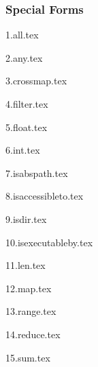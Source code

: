 
\subsubsection{Special Forms}
{
	\lipsum[1]
	
	{1.all.tex}
	
	{2.any.tex}
	
	{3.crossmap.tex}
	
	{4.filter.tex}
	
	{5.float.tex}
	
	{6.int.tex}
	
	{7.isabspath.tex}
	
	{8.isaccessibleto.tex}
	
	{9.isdir.tex}
	
	{10.isexecutableby.tex}
	
	{11.len.tex}
	
	{12.map.tex}
	
	{13.range.tex}
	
	{14.reduce.tex}
	
	{15.sum.tex}
}
